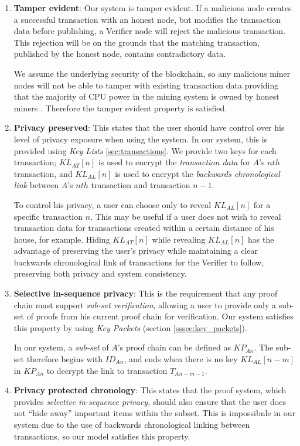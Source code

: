 \documentclass[12pt]{article}
\begin{document}
\begin{enumerate}
\item[] \textbf{Tamper evident}: Our system is tamper evident. If a malicious node creates a successful transaction with an honest node, but modifies the transaction data before publishing, a Verifier node will reject the malicious transaction. This rejection will be on the grounds that the matching transaction, published by the honest node, contains contradictory data.

We assume the underlying security of the blockchain, so any malicious miner nodes will not be able to tamper with existing transaction data providing that the majority of CPU power in the mining system is owned by honest miners \cite{bitcoin}. Therefore the tamper evident property is satisfied.

\item[] \textbf{Privacy preserved}: This states that the user should have control over his level of privacy exposure when using the system. In our system, this is provided using \textit{Key Lists} \ref{sec:transactions}. We provide two keys for each transaction; $KL_{AT}[n]$ is used to encrypt the \textit{transaction data} for $A$'s $nth$ transaction, and $KL_{AL}[n]$ is used to encrypt the \textit{backwards chronological link} between $A$'s $nth$ transaction and transaction $n-1$.

To control his privacy, a user can choose only to reveal $KL_{AL}[n]$ for a specific transaction $n$. This may be useful if a user does not wish to reveal transaction data for transactions created within a certain distance of his house, for example. Hiding $KL_{AT}[n]$ while revealing $KL_{AL}[n]$ has the advantage of preserving the user's privacy while maintaining a clear backwards chronological link of transactions for the Verifier to follow, preserving both privacy and system consistency.

\item[] \textbf{Selective in-sequence privacy}: This is the requirement that any proof chain must support \textit{sub-set verification}, allowing a user to provide only a sub-set of proofs from his current proof chain for verification. Our system satisfies this property by using \textit{Key Packets} (section \ref{sssec:key_packets}).

In our system, a \textit{sub-set} of $A$'s proof chain can be defined as $KP_{An}$. The sub-set therefore begins with $ID_{An}$, and ends when there is no key $KL_{AL}[n-m]$ in $KP_{An}$ to decrypt the link to transaction $T_{An-m-1}$. 

\item[] \textbf{Privacy protected chronology}: This states that the proof system, which provides \textit{selective in-sequence privacy}, should also ensure that the user does not ``hide away'' important items within the subset. This is impossibnle in our system due to the use of backwards chronological linking between transactions, so our model satisfies this property.


\end{enumerate}
\end{document}
